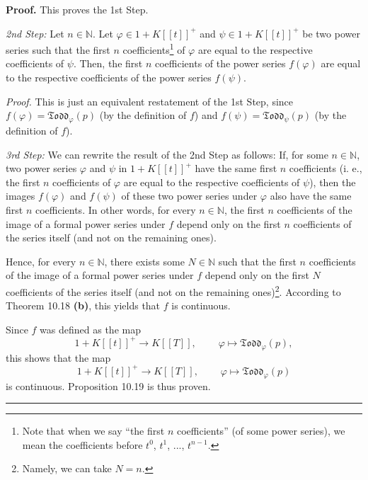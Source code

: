 \documentclass[numbers=enddot,12pt,final,onecolumn,notitlepage]{scrartcl}%
\newenvironment{proof}[1][Proof]{\noindent\textbf{#1.} }{\ \rule{0.5em}{0.5em}}
\begin{document}
\begin{proof}
This proves the 1st Step.

\textit{2nd Step:} Let $n\in\mathbb{N}$. Let $\varphi\in1+K\left[  \left[
t\right]  \right]  ^{+}$ and $\psi\in1+K\left[  \left[  t\right]  \right]
^{+}$ be two power series such that the first $n$ coefficients\footnote{Note
that when we say ``the first $n$ coefficients'' (of some power series), we
mean the coefficients before $t^{0}$, $t^{1}$, $...$, $t^{n-1}$.} of $\varphi$
are equal to the respective coefficients of $\psi$. Then, the first $n$
coefficients of the power series $f\left(  \varphi\right)  $ are equal to the
respective coefficients of the power series $f\left(  \psi\right)  $.

\textit{Proof.} This is just an equivalent restatement of the 1st Step, since
$f\left(  \varphi\right)  =\mathfrak{Todd}_{\varphi}\left(  p\right)  $ (by
the definition of $f$) and $f\left(  \psi\right)  =\mathfrak{Todd}_{\psi
}\left(  p\right)  $ (by the definition of $f$).

\textit{3rd Step:} We can rewrite the result of the 2nd Step as follows: If,
for some $n\in\mathbb{N}$, two power series $\varphi$ and $\psi$ in
$1+K\left[  \left[  t\right]  \right]  ^{+}$ have the same first $n$
coefficients (i. e., the first $n$ coefficients of $\varphi$ are equal to the
respective coefficients of $\psi$), then the images $f\left(  \varphi\right)
$ and $f\left(  \psi\right)  $ of these two power series under $\varphi$ also
have the same first $n$ coefficients. In other words, for every $n\in
\mathbb{N}$, the first $n$ coefficients of the image of a formal power series
under $f$ depend only on the first $n$ coefficients of the series itself (and
not on the remaining ones).

Hence, for every $n\in\mathbb{N}$, there exists some $N\in\mathbb{N}$ such
that the first $n$ coefficients of the image of a formal power series under
$f$ depend only on the first $N$ coefficients of the series itself (and not on
the remaining ones)\footnote{Namely, we can take $N=n$.}. According to Theorem
10.18 \textbf{(b)}, this yields that $f$ is continuous.

Since $f$ was defined as the map%
\[
1+K\left[  \left[  t\right]  \right]  ^{+}\rightarrow K\left[  \left[
T\right]  \right]  ,\ \ \ \ \ \ \ \ \ \ \varphi\mapsto\mathfrak{Todd}%
_{\varphi}\left(  p\right)  ,
\]
this shows that the map%
\[
1+K\left[  \left[  t\right]  \right]  ^{+}\rightarrow K\left[  \left[
T\right]  \right]  ,\ \ \ \ \ \ \ \ \ \ \varphi\mapsto\mathfrak{Todd}%
_{\varphi}\left(  p\right)
\]
is continuous. Proposition 10.19 is thus proven.
\end{proof}
\end{document}
